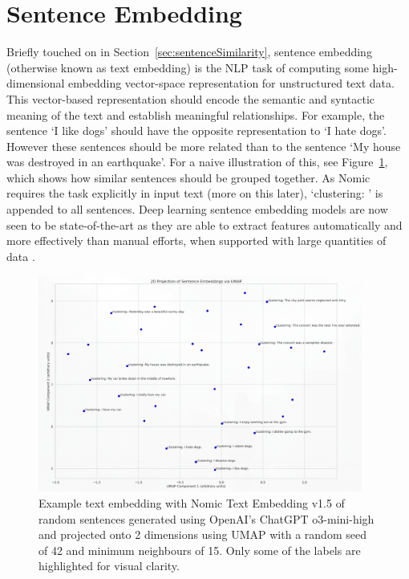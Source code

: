 \documentclass[10pt,oneside]{report}
\begin{document}
\section{Sentence Embedding}\label{sec:sentenceEmbedding}
Briefly touched on in Section~\ref{sec:sentenceSimilarity}, sentence embedding (otherwise known as text embedding) is the NLP task of computing some high-dimensional embedding vector-space representation for unstructured text data. This vector-based representation should encode the semantic and syntactic meaning of the text and establish meaningful relationships. For example, the sentence `I like dogs' should have the opposite representation to `I hate dogs'.  However these sentences should be more related than to the sentence `My house was destroyed in an earthquake'. For a naive illustration of this, see Figure~\ref{fig:sentenceEmbeddingExample}, which shows how similar sentences should be grouped together. As Nomic requires the task explicitly in input text (more on this later), `clustering: ' is appended to all sentences. Deep learning sentence embedding models are now seen to be state-of-the-art as they are able to extract features automatically and more effectively than manual efforts, when supported with large quantities of data \cite{liang2017text}.

\begin{figure}[htbp]
    \centering
    \includegraphics[width=0.95\textwidth]{sentenceEmbeddingExample.png}
    \caption{Example text embedding with Nomic Text Embedding v1.5 \cite{nussbaum2024nomic} of random sentences generated using OpenAI's ChatGPT o3-mini-high and projected onto 2 dimensions using UMAP \cite{mcinnes2018umap} with a random seed of 42 and minimum neighbours of 15. Only some of the labels are highlighted for visual clarity.}\label{fig:sentenceEmbeddingExample}
\end{figure}
\end{document}

